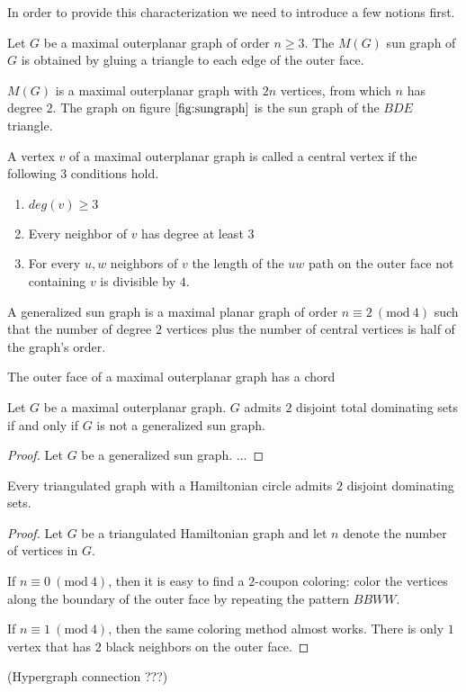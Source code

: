 In order to provide this characterization we need to introduce a few notions first.
\begin{definition}
  Let $G$ be a maximal outerplanar graph of order $n \ge 3$. The $M(G)$ sun graph
  of $G$ is obtained by gluing a triangle to each edge of the outer face.
\end{definition}
\begin{remark}
  $M(G)$ is a maximal outerplanar graph with $2n$ vertices, from which $n$ has
  degree $2$. The graph on figure $\ref{fig:sungraph}$ is the sun graph of
  the $BDE$ triangle.
\end{remark}
\begin{definition}
  A vertex $v$ of a maximal outerplanar graph is called a central vertex if the
  following $3$ conditions hold.
  \begin{enumerate}
    \item $deg(v) \ge 3$
    \item Every neighbor of $v$ has degree at least $3$
    \item For every $u, w$ neighbors of $v$ the length of the $uw$ path on the
    outer face not containing $v$ is divisible by $4$.
  \end{enumerate}
\end{definition}
\begin{definition}
  A generalized sun graph is a maximal planar graph of order
  $n \equiv 2\ (\textrm{mod}\ 4)$ such that the number of
  degree $2$ vertices plus the number of central vertices is half of the graph's
  order.
\end{definition}

\begin{lemma}
  The outer face of a maximal outerplanar graph has a chord
\end{lemma}

\begin{thm}
  Let $G$ be a maximal outerplanar graph. $G$ admits $2$ disjoint total dominating
  sets if and only if $G$ is not a generalized sun graph.
\end{thm}
\begin{proof}
  Let $G$ be a generalized sun graph. ...
\end{proof}


\begin{thm}
  Every triangulated graph with a Hamiltonian circle admits $2$ disjoint
  dominating sets.
\end{thm}
\begin{proof}
  Let $G$ be a triangulated Hamiltonian graph and let $n$ denote the number of
  vertices in $G$.

  If $n \equiv 0\ (\textrm{mod}\ 4)$, then it is easy to find a $2$-coupon coloring:
  color the vertices along the boundary of the outer face by repeating the pattern
  $BBWW$.

  If $n \equiv 1\ (\textrm{mod}\ 4)$, then the same coloring method almost works.
  There is only $1$ vertex that has $2$ black neighbors on the outer face.
\end{proof}


(Hypergraph connection ???)
